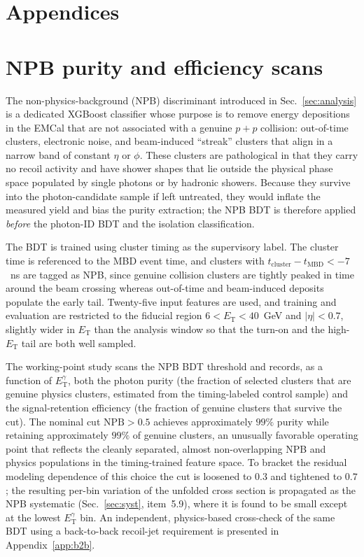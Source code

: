 \documentclass[11pt]{article}
\newcommand{\ET}{E_{\mathrm{T}}}
\newcommand{\ETg}{E_{\mathrm{T}}^{\gamma}}
\begin{document}
\newpage
\appendix
\section*{Appendices}

\section{NPB purity and efficiency scans}
\label{app:npb}
The non-physics-background (NPB) discriminant introduced in
Sec.~\ref{sec:analysis} is a dedicated XGBoost classifier whose purpose is to
remove energy depositions in the EMCal that are not associated with a genuine
$p+p$ collision: out-of-time clusters, electronic noise, and beam-induced
``streak'' clusters that align in a narrow band of constant $\eta$ or $\phi$.
These clusters are pathological in that they carry no recoil activity and have
shower shapes that lie outside the physical phase space populated by single
photons or by hadronic showers. Because they survive into the photon-candidate
sample if left untreated, they would inflate the measured yield and bias the
purity extraction; the NPB BDT is therefore applied \emph{before} the photon-ID
BDT and the isolation classification.

The BDT is trained using cluster timing as the supervisory label. The cluster
time is referenced to the MBD event time, and clusters with
$t_{\mathrm{cluster}} - t_{\mathrm{MBD}} < -7$~ns are tagged as NPB, since
genuine collision clusters are tightly peaked in time around the beam crossing
whereas out-of-time and beam-induced deposits populate the early tail. Twenty-five
input features are used, and training and evaluation are restricted to the
fiducial region $6 < \ET < 40$~GeV and $|\eta| < 0.7$, slightly wider in $\ET$
than the analysis window so that the turn-on and the high-$\ET$ tail are both
well sampled.

The working-point study scans the NPB BDT threshold and records, as a function
of $\ETg$, both the photon purity (the fraction of selected clusters that are
genuine physics clusters, estimated from the timing-labeled control sample) and
the signal-retention efficiency (the fraction of genuine clusters that survive
the cut). The nominal cut $\mathrm{NPB}>0.5$ achieves approximately $99\%$
purity while retaining approximately $99\%$ of genuine clusters, an unusually
favorable operating point that reflects the cleanly separated, almost
non-overlapping NPB and physics populations in the timing-trained feature space.
To bracket the residual modeling dependence of this choice the cut is loosened to
$0.3$ and tightened to $0.7$; the resulting per-bin variation of the unfolded
cross section is propagated as the NPB systematic (Sec.~\ref{sec:syst},
item~5.9), where it is found to be small except at the lowest $\ETg$ bin. An
independent, physics-based cross-check of the same BDT using a back-to-back
recoil-jet requirement is presented in Appendix~\ref{app:b2b}.
\end{document}
